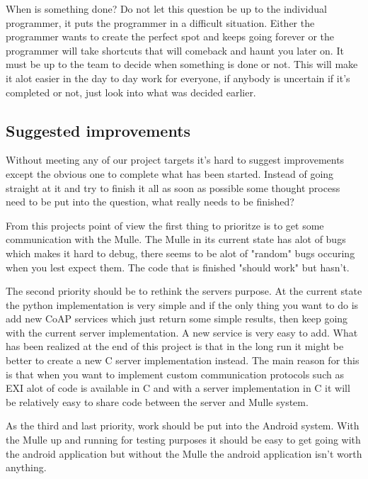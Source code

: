 When is something done?
Do not let this question be up to the individual programmer, it puts the programmer in a difficult situation.
Either the programmer wants to create the perfect spot and keeps going forever or the programmer will take shortcuts that will comeback and haunt you later on.
It must be up to the team to decide when something is done or not.
This will make it alot easier in the day to day work for everyone, if anybody is uncertain if it's completed or not, just look into what was decided earlier.
\subsection{Suggested improvements}
Without meeting any of our project targets it's hard to suggest improvements except the obvious one to complete what has been started. 
Instead of going straight at it and try to finish it all as soon as possible some thought process need to be put into the question, what really needs to be finished?

From this projects point of view the first thing to prioritze is to get some communication with the Mulle.
The Mulle in its current state has alot of bugs which makes it hard to debug, there seems to be alot of "random" bugs occuring when you lest expect them. 
The code that is finished "should work" but hasn't.

The second priority should be to rethink the servers purpose.
At the current state the python implementation is very simple and if the only thing you want to do is add new CoAP services which just return some simple results, then keep going with the current server implementation.
A new service is very easy to add.
What has been realized at the end of this project is that in the long run it might be better to create a new C server implementation instead.
The main reason for this is that when you want to implement custom communication protocols such as EXI alot of code is available in C and with a server implementation in C it will be relatively easy to share code between the server and Mulle system.

As the third and last priority, work should be put into the Android system. With the Mulle up and running for testing purposes it should be easy to get going with the android application but without the Mulle the android application isn't worth anything.



%
%
